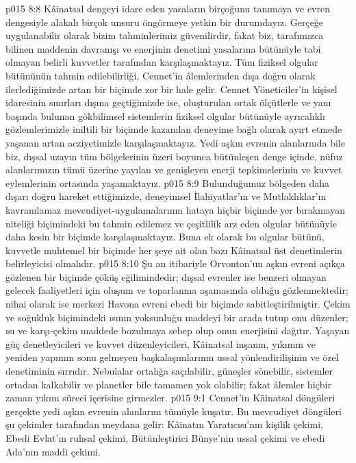 \vs p015 8:8 Kâinatsal dengeyi idare eden yasaların birçoğunu tanımaya ve evren dengesiyle alakalı birçok unsuru öngörmeye yetkin bir durumdayız. Gerçeğe uygulanabilir olarak bizim tahminlerimiz güvenilirdir, fakat biz, tarafımızca bilinen maddenin davranışı ve enerjinin denetimi yasalarına bütünüyle tabi olmayan belirli kuvvetler tarafından karşılaşmaktayız. Tüm fiziksel olgular bütününün tahmin edilebilirliği, Cennet’in âlemlerinden dışa doğru olarak ilerlediğimizde artan bir biçimde zor bir hale gelir. Cennet Yöneticiler’in kişisel idaresinin sınırları dışına geçtiğimizde ise, oluşturulan ortak ölçütlerle ve yanı başında bulunan gökbilimsel sistemlerin fiziksel olgular bütünüyle ayrıcalıklı gözlemlerimizle iniltili bir biçimde kazanılan deneyime bağlı olarak ayırt etmede yaşanan artan acziyetimizle karşılaşmaktayız. Yedi aşkın evrenin alanlarında bile biz, dışsal uzayın tüm bölgelerinin üzeri boyunca bütünleşen denge içinde, nüfuz alanlarımızın tümü üzerine yayılan ve genişleyen enerji tepkimelerinin ve kuvvet eylemlerinin ortasında yaşamaktayız.
\vs p015 8:9 Bulunduğumuz bölgeden daha dışarı doğru hareket ettiğimizde, deneyimsel İlahiyatlar’ın ve Mutlaklıklar’ın kavranılamaz mevcudiyet\hyp{}uygulamalarının hataya hiçbir biçimde yer bırakmayan niteliği biçimindeki bu tahmin edilemez ve çeşitlilik arz eden olgular bütünüyle daha kesin bir biçimde karşılaşmaktayız. Buna ek olarak bu olgular bütünü, kuvvetle muhtemel bir biçimde her şeye ait olan bazı Kâinatsal üst denetimlerin belirleyicisi olmalıdır.
\vs p015 8:10 Şu an itibariyle Orvonton’un aşkın evreni açıkça gözlenen bir biçimde çöküş eğilimindedir; dışsal evrenler ise benzeri olmayan gelecek faaliyetleri için oluşum ve toparlanma aşamasında olduğu gözlenmektedir; nihai olarak ise merkezi Havona evreni ebedi bir biçimde sabitleştirilmiştir. Çekim ve soğukluk biçimindeki ısının yoksunluğu maddeyi bir arada tutup onu düzenler; ısı ve karşı\hyp{}çekim maddede bozulmaya sebep olup onun enerjisini dağıtır. Yaşayan güç denetleyicileri ve kuvvet düzenleyicileri, Kâinatsal inşanın, yıkımın ve yeniden yapımın sonu gelmeyen başkalaşımlarının ussal yönlendirilişinin ve özel denetiminin sırrıdır. Nebulalar ortalığa saçılabilir, güneşler sönebilir, sistemler ortadan kalkabilir ve planetler bile tamamen yok olabilir; fakat âlemler hiçbir zaman yıkım süreci içerisine girmezler.
\vs p015 9:1 Cennet’in Kâinatsal döngüleri gerçekte yedi aşkın evrenin alanlarını tümüyle kuşatır. Bu mevcudiyet döngüleri şu çekimler tarafından meydana gelir: Kâinatın Yaratıcısı’nın kişilik çekimi, Ebedi Evlat’ın ruhsal çekimi, Bütünleştirici Bünye’nin ussal çekimi ve ebedi Ada’nın maddi çekimi.

